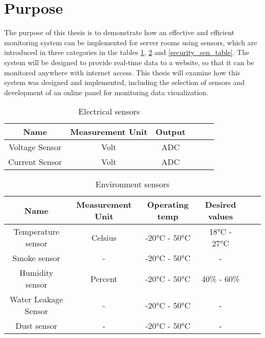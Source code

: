         \section{Purpose}
            The purpose of this thesis is to demonstrate how an effective and efficient monitoring system can be implemented for server rooms using sensors, which are introduced in three categories in the tables \ref{electrical_sensors_table}, \ref{envirement_sen_table} and \ref{security_sen_table}. The system will be designed to provide real-time data to a website, so that it can be monitored anywhere with internet access. This thesis will examine how this system was designed and implemented, including the selection of sensors and development of an online panel for monitoring data visualization.
            
            \begin{table}
                \centering
                \caption{Electrical sensors}
                \begin{tabular}{ |c|c|c|c|c|c|}
                \hline
                {\textbf{Name}} & {\textbf{Measurement Unit}} & {\textbf{Output}} \\ 
                \hline

                Voltage Sensor & Volt &  ADC \\
                \hline
                
                Current Sensor & Volt &  ADC \\
                \hline
                \end{tabular}
                \label {electrical_sensors_table}
            \end{table}
               
            \begin{table}
                \centering
                \caption{Environment sensors}
                \begin{tabular}{ |c|c|c|c|c|c|}
                    \hline
                    {\textbf{Name}} & {\textbf{Measurement Unit}} & {\textbf{Operating temp}}& {\textbf{Desired values}}   \\ 
                    \hline

                    Temperature sensor & Celsius & -20°C - 50°C & 18°C - 27°C\\
                    \hline
                    Smoke sensor &  - & -20°C - 50°C & -  \\
                    \hline
                    Humidity sensor & Percent &  -20°C - 50°C & 40\% - 60\% \\
                    \hline
                    Water Leakage Sensor &  - & -20°C - 50°C & -  \\
                    \hline
                    Dust sensor &  - & -20°C - 50°C & -  \\
                    \hline
                \end{tabular}
                \label {envirement_sen_table}
            \end{table}
        
